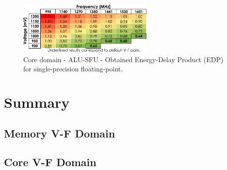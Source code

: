 \begin{figure}[htb]
    \centering
        \includegraphics[width=0.6\textwidth]{Figures/GPU_characterization/SFU_EDP_SP.pdf}
        \caption{Core domain - ALU-SFU - Obtained Energy-Delay Product (EDP) for single-precision floating-point.}
    \label{fig:SFU_EDP}
\end{figure}



\section{Summary}


\subsection{Memory V-F Domain}
\label{section:memory}



\subsection{Core V-F Domain}
\label{section:core}